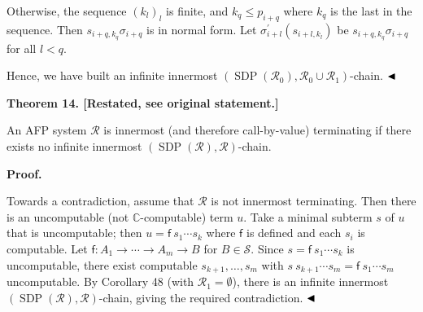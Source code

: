 Otherwise, the sequence $(k_{l})_{l}$ is finite, and $k_{q}\leq p_{i+q}$ where $k_{q}$ is the last in the sequence. Then $s_{i+q,k_{q}}\sigma_{i+q}$ is in normal form. Let $\sigma^{\prime}_{i+l}(s_{i+l,k_{l}})$ be $s_{i+q,k_{q}}\sigma_{i+q}$ for all $l<q$.\par
 
 
  
 
 
Hence, we have built an infinite innermost $(\operatorname{SDP}(\mathcal{R}_{0}),\mathcal{R}_{0}\cup\mathcal{R}_{1})$-chain. $\hfill\blacktriangleleft$\par
 
 
 
 
\par\medskip\noindent\textbf{Theorem 14. [Restated, see original statement.]}\par
 
 
An AFP system $\mathcal{R}$ is innermost (and therefore call-by-value) terminating if there exists no infinite innermost $(\operatorname{SDP}(\mathcal{R}),\mathcal{R})$-chain.\par
 
 
 
 
 
 
\par\medskip\noindent\textbf{Proof.}\par
 
 
Towards a contradiction, assume that $\mathcal{R}$ is not innermost terminating. Then there is an uncomputable (not $\mathbb{C}$-computable) term $u$. Take a minimal subterm $s$ of $u$ that is uncomputable; then $u={\mathsf{f}}\ {{s}_{1}\cdots{s}_{k}}$ where $\mathsf{f}$ is defined and each $s_{i}$ is computable. Let $\mathsf{f}:{A}_{1}\rightarrow\cdots\rightarrow{A}_{m}\rightarrow B$ for $B\in\mathcal{S}$. Since $s={\mathsf{f}}\ {{s}_{1}\cdots{s}_{k}}$ is uncomputable, there exist computable ${s}_{k+1},\ldots,{s}_{m}$ with ${s}\ {{s}_{k+1}\cdots{s}_{m}}={\mathsf{f}}\ {{s}_{1}\cdots{s}_{m}}$ uncomputable. By Corollary 48 (with $\mathcal{R}_{1}=\emptyset$), there is an infinite innermost $(\operatorname{SDP}(\mathcal{R}),\mathcal{R})$-chain, giving the required contradiction. $\hfill\blacktriangleleft$\par
 
